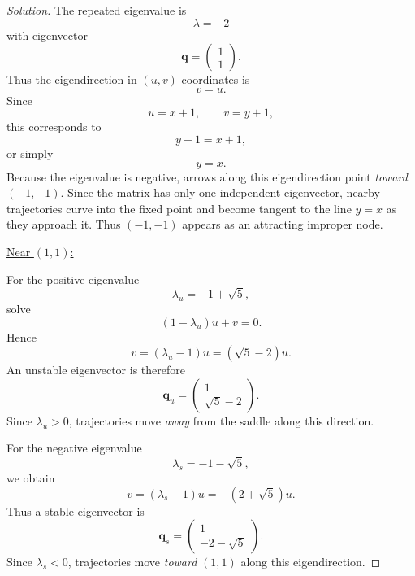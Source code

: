 \documentclass[12pt]{amsart}
\theoremstyle{conjecture}
\theoremstyle{definition}
\theoremstyle{question}
\theoremstyle{theorem}
\newenvironment{solution}
{\begin{proof}[Solution]}
{\end{proof}}
\begin{document}
\begin{solution}
        The repeated eigenvalue is
        \[
            \lambda=-2
        \]
        with eigenvector
        \[
            \mathbf{q}
            =
            \begin{pmatrix}
                1\\
                1
            \end{pmatrix}.
        \]
        Thus the eigendirection in $(u,v)$ coordinates is
        \[
            v=u.
        \]
        Since
        \[
            u=x+1,\qquad v=y+1,
        \]
        this corresponds to
        \[
            y+1=x+1,
        \]
        or simply
        \[
            \boxed{y=x.}
        \]
        Because the eigenvalue is negative, arrows along this eigendirection
        point \emph{toward} $(-1,-1)$.  Since the matrix has only one
        independent eigenvector, nearby trajectories curve into the fixed
        point and become tangent to the line $y=x$ as they approach it.
        Thus $(-1,-1)$ appears as an attracting improper node.

        \medskip
        \underline{Near $(1,1)$:}

        For the positive eigenvalue
        \[
            \lambda_u=-1+\sqrt{5},
        \]
        solve
        \[
            (1-\lambda_u)u+v=0.
        \]
        Hence
        \[
            v=(\lambda_u-1)u
            =
            (\sqrt{5}-2)u.
        \]
        An unstable eigenvector is therefore
        \[
            \boxed{
                \mathbf{q}_u=
                \begin{pmatrix}
                    1\\
                    \sqrt{5}-2
                \end{pmatrix}.}
        \]
        Since $\lambda_u>0$, trajectories move \emph{away} from the saddle
        along this direction.

        For the negative eigenvalue
        \[
            \lambda_s=-1-\sqrt{5},
        \]
        we obtain
        \[
            v=(\lambda_s-1)u
            =
            -(2+\sqrt{5})u.
        \]
        Thus a stable eigenvector is
        \[
            \boxed{
                \mathbf{q}_s=
                \begin{pmatrix}
                    1\\
                    -2-\sqrt{5}
                \end{pmatrix}.}
        \]
        Since $\lambda_s<0$, trajectories move \emph{toward} $(1,1)$ along
        this eigendirection.


\end{solution}
\end{document}
